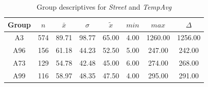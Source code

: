 \begin{table}[ht]
	\tiny
	\centering
	\begin{tabular}{c|c|c|c|c|c|c|c}
		\toprule
		Group & $n$ & $\bar{x}$ & $\sigma$ & $\tilde{x}$ & $min$ & $max$ & $\Delta$ \\  
		\midrule
		A3 & 574 & 89.71 & 98.77 & 65.00 & 4.00 & 1260.00 & 1256.00 \\ 
		A96 & 156 & 61.18 & 44.23 & 52.50 & 5.00 & 247.00 & 242.00 \\ 
		A73 & 129 & 54.78 & 42.48 & 45.00 & 6.00 & 274.00 & 268.00 \\ 
		A99 & 116 & 58.97 & 48.35 & 47.50 & 4.00 & 295.00 & 291.00 \\ 
		\bottomrule
	\end{tabular}
	\caption{Group descriptives for \textit{Street} and \textit{TempAvg}}
	\label{tbl:descriptives_baysis_matched_Strasse_TAvg}
	\vspace{-8mm}
\end{table}

